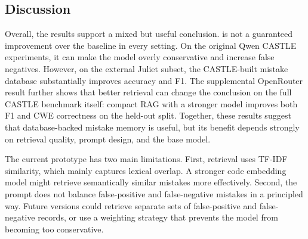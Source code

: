 \subsection{Discussion}

Overall, the results support a mixed but useful conclusion. \system is not a guaranteed improvement over the baseline in every setting. On the original Qwen CASTLE experiments, it can make the model overly conservative and increase false negatives. However, on the external Juliet subset, the CASTLE-built mistake database substantially improves accuracy and F1. The supplemental OpenRouter result further shows that better retrieval can change the conclusion on the full CASTLE benchmark itself: compact RAG with a stronger model improves both F1 and CWE correctness on the held-out split. Together, these results suggest that database-backed mistake memory is useful, but its benefit depends strongly on retrieval quality, prompt design, and the base model.

The current prototype has two main limitations. First, retrieval uses TF-IDF similarity, which mainly captures lexical overlap. A stronger code embedding model might retrieve semantically similar mistakes more effectively. Second, the prompt does not balance false-positive and false-negative mistakes in a principled way. Future versions could retrieve separate sets of false-positive and false-negative records, or use a weighting strategy that prevents the model from becoming too conservative.
